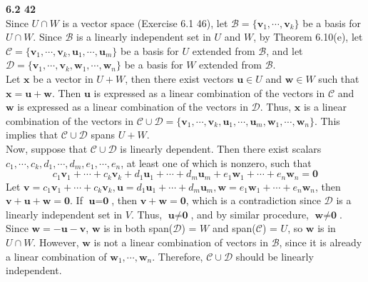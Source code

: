 \textbf{6.2 42} \\
Since $U \cap W$ is a vector space (Exercise 6.1 46), let $\mathcal{B} = \{\textbf{v}_1, \cdots, \textbf{v}_k\}$ be a basis for $U \cap W$. Since $\mathcal{B}$ is a linearly independent set in $U$ and $W$, by Theorem 6.10(e), let $\mathcal{C} = \{\textbf{v}_1, \cdots, \textbf{v}_k, \textbf{u}_1, \cdots, \textbf{u}_m\}$ be a basis for $U$ extended from $\mathcal{B}$, and let $\mathcal{D} = \{\textbf{v}_1, \cdots, \textbf{v}_k, \textbf{w}_1, \cdots, \textbf{w}_n\}$ be a basis for $W$ extended from $\mathcal{B}$. \\

Let $\textbf{x}$ be a vector in $U + W$, then there exist vectors $\textbf{u} \in U$ and $\textbf{w} \in W$ such that $\textbf{x} = \textbf{u} + \textbf{w}$. Then $\textbf{u}$ is expressed as a linear combination of the vectors in $\mathcal{C}$ and $\textbf{w}$ is expressed as a linear combination of the vectors in $\mathcal{D}$. Thus, $\textbf{x}$ is a linear combination of the vectors in $\mathcal{C} \cup \mathcal{D} = \{\textbf{v}_1, \cdots, \textbf{v}_k, \textbf{u}_1, \cdots, \textbf{u}_m, \textbf{w}_1, \cdots, \textbf{w}_n\}$. This implies that $\mathcal{C} \cup \mathcal{D}$ spans $U + W$. \\

Now, suppose that $\mathcal{C} \cup \mathcal{D}$ is linearly dependent. Then there exist scalars $c_1, \cdots, c_k, d_1, \cdots, d_m, e_1, \cdots, e_n$, at least one of which is nonzero, such that \begin{equation*}
	c_1\textbf{v}_1 + \cdots + c_k\textbf{v}_k + d_1\textbf{u}_1 + \cdots + d_m\textbf{u}_m + e_1\textbf{w}_1 + \cdots + e_n\textbf{w}_n = \textbf{0}
\end{equation*} Let $\textbf{v} = c_1\textbf{v}_1 + \cdots + c_k\textbf{v}_k, \textbf{u} = d_1\textbf{u}_1 + \cdots + d_m\textbf{u}_m, \textbf{w} = e_1\textbf{w}_1 + \cdots + e_n\textbf{w}_n$, then $\textbf{v} + \textbf{u} + \textbf{w} = \textbf{0}$. If $\textbf{u} = \textbf{0}$, then $\textbf{v} + \textbf{w} = \textbf{0}$, which is a contradiction since $\mathcal{D}$ is a linearly independent set in $V$. Thus, $\textbf{u} \neq \textbf{0}$, and by similar procedure, $\textbf{w} \neq \textbf{0}$. \\

Since $\textbf{w} = -\textbf{u} - \textbf{v}$, $\textbf{w}$ is in both  span($\mathcal{D}$) = $W$ and span($\mathcal{C}$) = $U$, so $\textbf{w}$ is in $U \cap W$. However, $\textbf{w}$ is not a linear combination of vectors in $\mathcal{B}$, since it is already a linear combination of $\textbf{w}_1, \cdots, \textbf{w}_n$. Therefore, $\mathcal{C} \cup \mathcal{D}$ should be linearly independent. \\

